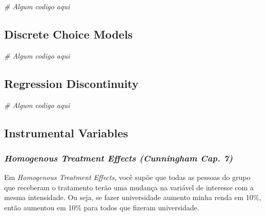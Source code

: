 \documentclass[
]{article}
\newenvironment{Shaded}{\begin{snugshade}}{\end{snugshade}}
\newcommand{\CommentTok}[1]{\textcolor[rgb]{0.56,0.35,0.01}{\textit{#1}}}
\begin{document}
\begin{Shaded}
\begin{Highlighting}[]
\CommentTok{\# Algum codigo aqui}
\end{Highlighting}
\end{Shaded}

\newpage

\hypertarget{discrete-choice-models}{%
\subsection{Discrete Choice Models}\label{discrete-choice-models}}

\begin{Shaded}
\begin{Highlighting}[]
\CommentTok{\# Algum codigo aqui}
\end{Highlighting}
\end{Shaded}

\newpage

\hypertarget{regression-discontinuity}{%
\subsection{Regression Discontinuity}\label{regression-discontinuity}}

\begin{Shaded}
\begin{Highlighting}[]
\CommentTok{\# Algum codigo aqui}
\end{Highlighting}
\end{Shaded}

\newpage

\hypertarget{instrumental-variables}{%
\subsection{Instrumental Variables}\label{instrumental-variables}}

\hypertarget{homogenous-treatment-effects-cunningham-cap.-7}{%
\subsubsection{\texorpdfstring{\emph{Homogenous Treatment Effects
(Cunningham Cap.
7)}}{Homogenous Treatment Effects (Cunningham Cap. 7)}}\label{homogenous-treatment-effects-cunningham-cap.-7}}

Em \emph{Homogenous Treatment Effects}, você supõe que todas as pessoas
do grupo que receberam o tratamento terão uma mudança na variável de
interesse com a mesma intensidade. Ou seja, se fazer universidade
aumento minha renda em 10\%, então aumentou em 10\% para todos que
fizeram universidade.
\end{document}
